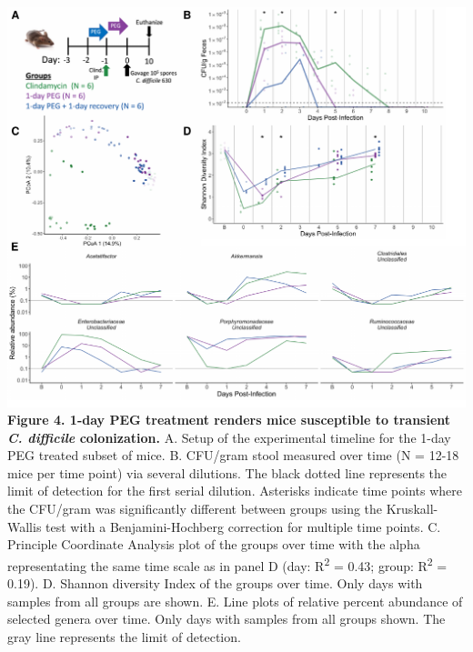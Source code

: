 \documentclass[
  11pt,
]{article}
\begin{document}
\includegraphics{figure_4.pdf} \textbf{Figure 4. 1-day PEG treatment
renders mice susceptible to transient \emph{C. difficile} colonization.}
A. Setup of the experimental timeline for the 1-day PEG treated subset
of mice. B. CFU/gram stool measured over time (N = 12-18 mice per time
point) via several dilutions. The black dotted line represents the limit
of detection for the first serial dilution. Asterisks indicate time
points where the CFU/gram was significantly different between groups
using the Kruskall-Wallis test with a Benjamini-Hochberg correction for
multiple time points. C. Principle Coordinate Analysis plot of the
groups over time with the alpha representating the same time scale as in
panel D (day: R\textsuperscript{2} = 0.43; group: R\textsuperscript{2} =
0.19). D. Shannon diversity Index of the groups over time. Only days
with samples from all groups are shown. E. Line plots of relative
percent abundance of selected genera over time. Only days with samples
from all groups shown. The gray line represents the limit of detection.
\end{document}
